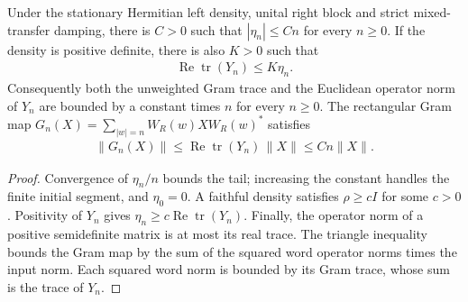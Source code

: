 \begin{lemma}
    \label{lem:uncle_wall_gram_linear_bounds}
    \leanok
    Under the stationary Hermitian left density, unital right block and
    strict mixed-transfer damping, there is $C>0$ such that
    $|\eta_n|\le Cn$ for every $n\ge0$. If the density is positive
    definite, there is also $K>0$ such that
    \begin{align}
        \operatorname{Re}\operatorname{tr}(Y_n)\le K\eta_n.
    \end{align}
    Consequently both the unweighted Gram trace and the Euclidean operator
    norm of $Y_n$ are bounded by a constant times $n$ for every $n\ge0$.
    The rectangular Gram map
    $G_n(X)=\sum_{|w|=n}W_R(w)XW_R(w)^*$ satisfies
    \begin{align}
        \lVert G_n(X)\rVert\le
        \operatorname{Re}\operatorname{tr}(Y_n)\,\lVert X\rVert
        \le Cn\lVert X\rVert.
    \end{align}
\end{lemma}
\begin{proof}
    \leanok
    Convergence of $\eta_n/n$ bounds the tail; increasing the constant
    handles the finite initial segment, and $\eta_0=0$. A faithful
    density satisfies $\rho\ge cI$ for some $c>0$. Positivity of $Y_n$
    gives $\eta_n\ge c\operatorname{Re}\operatorname{tr}(Y_n)$.
    Finally, the operator norm of a positive semidefinite matrix is at
    most its real trace. The triangle inequality bounds the Gram map by
    the sum of the squared word operator norms times the input norm.
    Each squared word norm is bounded by its Gram trace, whose sum is
    the trace of $Y_n$.
\end{proof}
